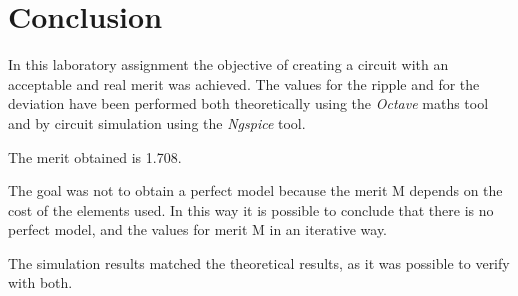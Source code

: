 \newpage



\section{Conclusion}
\label{sec:conclusion}

In this laboratory assignment the objective of creating a circuit with an acceptable and real merit was achieved. The values for the ripple and for the deviation have been performed both
theoretically using the \textit{Octave} maths tool and by circuit simulation using the
\textit{Ngspice} tool. 

The merit obtained is 1.708.

The goal was not to obtain a perfect model because the merit M depends on the cost of the elements used. In this way it is possible to conclude that there is no perfect model, and the values for merit M in an iterative way. 

The simulation results matched the theoretical results, as it was possible to verify with both.  

